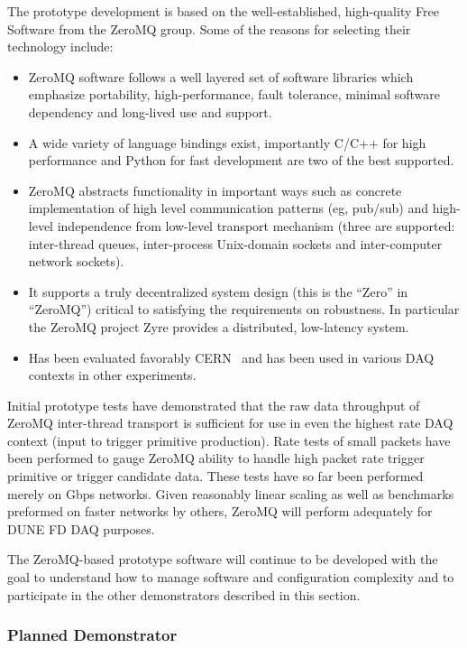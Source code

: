 The prototype development is based on the well-established, high-quality Free Software from the ZeroMQ group.
Some of the reasons for selecting their technology include:
\begin{itemize}
\item ZeroMQ software follows a well layered set of software libraries which emphasize portability, high-performance, fault tolerance, minimal software dependency and long-lived use and support.
\item A wide variety of language bindings exist, importantly C/C++ for high performance and Python for fast development are two of the best supported.
\item ZeroMQ abstracts functionality in important ways such as concrete implementation of high level communication patterns (eg, pub/sub) and high-level independence from low-level transport mechanism (three are supported: inter-thread queues, inter-process Unix-domain sockets and inter-computer network sockets). 
\item It supports a truly decentralized system design (this is the ``Zero'' in ``ZeroMQ'') critical to satisfying the requirements on robustness.  In particular the ZeroMQ project Zyre provides a distributed, low-latency  system.
\item Has been evaluated favorably CERN~\cite{cernzeromq} and has been used in various DAQ contexts in other experiments.
\end{itemize}

Initial prototype tests have demonstrated that the raw data throughput of ZeroMQ inter-thread transport is sufficient for use in even the highest rate DAQ context (input to trigger primitive production).
Rate tests of small packets have been performed to gauge ZeroMQ ability to handle high packet rate trigger primitive or trigger candidate data. 
These tests have so far been performed merely on Gbps networks. 
Given reasonably linear scaling as well as benchmarks preformed on faster networks by others, ZeroMQ will perform adequately for DUNE FD DAQ purposes.

The ZeroMQ-based prototype software will continue to be developed with the goal to understand how to manage software and configuration complexity and to participate in the other demonstrators described in this section. 


\subsubsection{Planned   Demonstrator}
\label{sec:sp-daq:validation-pd-demonstrator}

